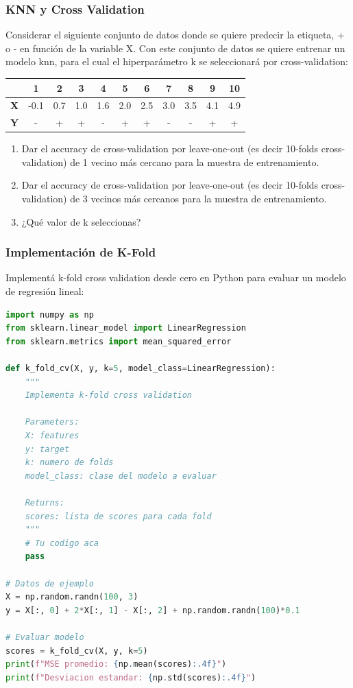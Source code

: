 \documentclass[12pt]{article}
\begin{document}
\subsubsection{KNN y Cross Validation}

Considerar el siguiente conjunto de datos donde se quiere predecir la etiqueta, + o - en función de la variable X. Con este conjunto de datos se quiere entrenar un modelo knn, para el cual el hiperparámetro k se seleccionará por cross-validation:

\begin{table}[H]
    \centering
    \begin{tabular}{|c|c|c|c|c|c|c|c|c|c|c|}
        \hline
        & \textbf{1} & \textbf{2} & \textbf{3} & \textbf{4} & \textbf{5} & \textbf{6} & \textbf{7} & \textbf{8} & \textbf{9} & \textbf{10} \\
        \hline
        \textbf{X} & -0.1 & 0.7 & 1.0 & 1.6 & 2.0 & 2.5 & 3.0 & 3.5 & 4.1 & 4.9 \\
        \hline
        \textbf{Y} & - & + & + & - & + & + & - & - & + & + \\
        \hline
    \end{tabular}
\end{table}

\begin{enumerate}
    \item Dar el accuracy de cross-validation por leave-one-out (es decir 10-folds cross-validation) de 1 vecino más cercano para la muestra de entrenamiento.
    \item Dar el accuracy de cross-validation por leave-one-out (es decir 10-folds cross-validation) de 3 vecinos más cercanos para la muestra de entrenamiento.
    \item ¿Qué valor de k seleccionas?
\end{enumerate}

\subsubsection{Implementación de K-Fold}

Implementá k-fold cross validation desde cero en Python para evaluar un modelo de regresión lineal:

\begin{lstlisting}[language=Python]
import numpy as np
from sklearn.linear_model import LinearRegression
from sklearn.metrics import mean_squared_error

def k_fold_cv(X, y, k=5, model_class=LinearRegression):
    """
    Implementa k-fold cross validation
    
    Parameters:
    X: features
    y: target
    k: numero de folds
    model_class: clase del modelo a evaluar
    
    Returns:
    scores: lista de scores para cada fold
    """
    # Tu codigo aca
    pass

# Datos de ejemplo
X = np.random.randn(100, 3)
y = X[:, 0] + 2*X[:, 1] - X[:, 2] + np.random.randn(100)*0.1

# Evaluar modelo
scores = k_fold_cv(X, y, k=5)
print(f"MSE promedio: {np.mean(scores):.4f}")
print(f"Desviacion estandar: {np.std(scores):.4f}")
\end{lstlisting}
\end{document}
